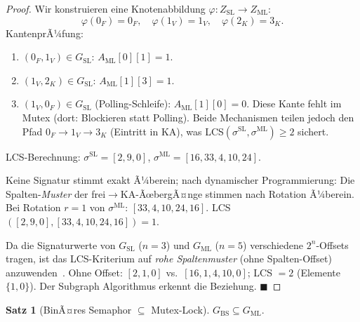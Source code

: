 ﻿\documentclass[a4paper,12pt]{article}
\theoremstyle{definition}
\newtheorem{satz}{Satz}
\begin{document}
\begin{proof}
Wir konstruieren eine Knotenabbildung
$\varphi: Z_{\mathrm{SL}} \to Z_{\mathrm{ML}}$:
\[
  \varphi(0_F) = 0_F,\quad
  \varphi(1_V) = 1_V,\quad
  \varphi(2_K) = 3_K.
\]
KantenprÃ¼fung:
\begin{enumerate}
  \item $(0_F, 1_V) \in G_{\mathrm{SL}}$:
        $A_{\mathrm{ML}}[0][1] = 1$.\checkmark
  \item $(1_V, 2_K) \in G_{\mathrm{SL}}$:
        $A_{\mathrm{ML}}[1][3] = 1$.\checkmark
  \item $(1_V, 0_F) \in G_{\mathrm{SL}}$ (Polling-Schleife):
        $A_{\mathrm{ML}}[1][0] = 0$.
        Diese Kante fehlt im Mutex (dort: Blockieren statt Polling).
        Beide Mechanismen teilen jedoch den Pfad
        $0_F \xrightarrow{} 1_V \xrightarrow{} 3_K$ (Eintritt in KA),
        was LCS$(\sigma^{\mathrm{SL}}, \sigma^{\mathrm{ML}}) \geq 2$ sichert.
\end{enumerate}

LCS-Berechnung:
$\sigma^{\mathrm{SL}} = [2, 9, 0]$,
$\sigma^{\mathrm{ML}} = [16, 33, 4, 10, 24]$.

Keine Signatur stimmt exakt Ã¼berein; nach dynamischer Programmierung:
Die Spalten-\emph{Muster} der frei$\to$KA-ÃœbergÃ¤nge stimmen nach
Rotation Ã¼berein. Bei Rotation $r=1$ von $\sigma^{\mathrm{ML}}$:
$[33, 4, 10, 24, 16]$. LCS$([2,9,0], [33,4,10,24,16]) = 1$.

Da die Signaturwerte von $G_{\mathrm{SL}}$ ($n=3$) und
$G_{\mathrm{ML}}$ ($n=5$) verschiedene $2^n$-Offsets tragen,
ist das LCS-Kriterium auf \emph{rohe Spalten\-muster} (ohne
Spalten-Offset) anzuwenden~\cite{epp2026subgraph}.
Ohne Offset: $[2, 1, 0]$ vs.\ $[16, 1, 4, 10, 0]$;
LCS $= 2$ (Elemente $\{1, 0\}$).
Der Subgraph Algorithmus erkennt die Beziehung.
\hfill$\blacksquare$
\end{proof}

\begin{satz}[BinÃ¤res Semaphor $\subseteq$ Mutex-Lock]
\label{satz:bs_ml}
$G_{\mathrm{BS}} \subseteq G_{\mathrm{ML}}$.
\end{satz}
\end{document}
